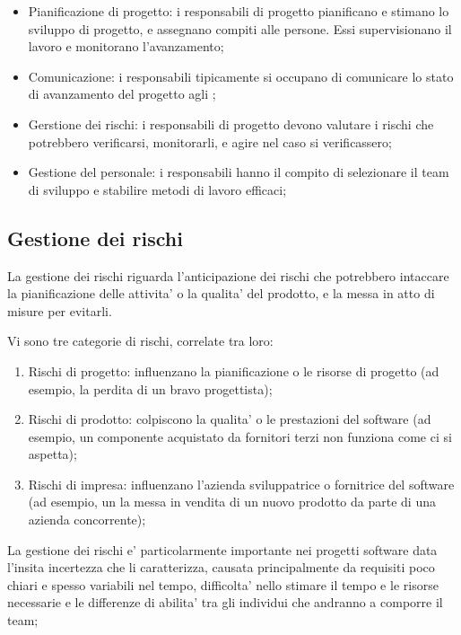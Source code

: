 \begin{itemize}
  \item Pianificazione di progetto: i responsabili di progetto pianificano e
    stimano lo sviluppo di progetto, e assegnano compiti alle persone. Essi
    supervisionano il lavoro e monitorano l'avanzamento;
  \item Comunicazione: i responsabili tipicamente si occupano di comunicare lo
    stato di avanzamento del progetto agli ;
  \item Gerstione dei rischi: i responsabili di progetto devono valutare i
    rischi che potrebbero verificarsi, monitorarli, e agire nel caso si
    verificassero;
  \item Gestione del personale: i responsabili hanno il compito di selezionare
    il team di sviluppo e stabilire metodi di lavoro efficaci;
\end{itemize}

\subsection{Gestione dei rischi}

La gestione dei rischi riguarda l'anticipazione dei rischi che potrebbero
intaccare la pianificazione delle attivita' o la qualita' del prodotto, e la
messa in atto di misure per evitarli.

Vi sono tre categorie di rischi, correlate tra loro:

\begin{enumerate}
  \item Rischi di progetto: influenzano la pianificazione o le risorse di
    progetto (ad esempio, la perdita di un bravo progettista);
  \item Rischi di prodotto: colpiscono la qualita' o le prestazioni del software
    (ad esempio, un componente acquistato da fornitori terzi non funziona come
    ci si aspetta);
  \item Rischi di impresa: influenzano l'azienda sviluppatrice o fornitrice del
    software (ad esempio, un la messa in vendita di un nuovo prodotto da parte
    di una azienda concorrente);
\end{enumerate}

La gestione dei rischi e' particolarmente importante nei progetti software data
l'insita incertezza che li caratterizza, causata principalmente da requisiti
poco chiari e spesso variabili nel tempo, difficolta' nello stimare il tempo e
le risorse necessarie e le differenze di abilita' tra gli individui che andranno
a comporre il team;


